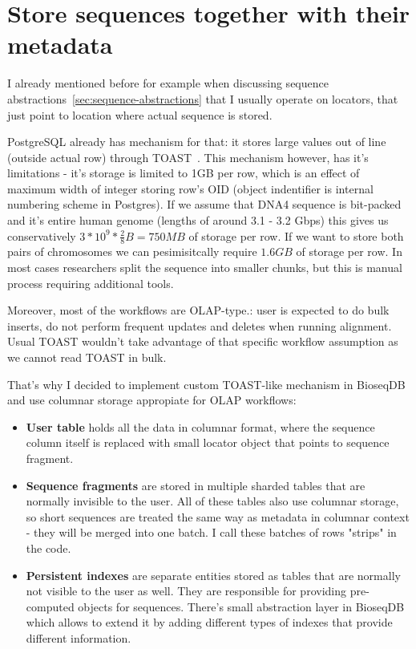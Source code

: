 
\section{Store sequences together with their metadata}
\label{sec:pg-storage-role}

I already mentioned before for example when discussing sequence abstractions~\ref{sec:sequence-abstractions} that I usually operate on locators, that just point to location where actual sequence is stored.

PostgreSQL already has mechanism for that: it stores large values out of line (outside actual row) through TOAST~\autocite{postgresql17_toast}. 
This mechanism however, has it's limitations - it's storage is limited to 1GB per row, which is an effect of maximum width of integer storing row's OID (object indentifier is internal numbering scheme in Postgres).
If we assume that DNA4 sequence is bit-packed and it's entire human genome (lengths of around 3.1 - 3.2 Gbps) this gives us conservatively $3 * 10^{9} * \frac{2}{8}B = 750MB$ of storage per row.
If we want to store both pairs of chromosomes we can pesimisitcally require $1.6GB$ of storage per row. 
In most cases researchers split the sequence into smaller chunks, but this is manual process requiring additional tools.

Moreover, most of the workflows are OLAP-type.: user is expected to do bulk inserts, do not perform frequent updates and deletes when running alignment.
Usual TOAST wouldn't take advantage of that specific workflow assumption as we cannot read TOAST in bulk.

That's why I decided to implement custom TOAST-like mechanism in BioseqDB and use columnar storage appropiate for OLAP workflows:
\begin{itemize}
  \item \textbf{User table} holds all the data in columnar format, where the sequence column itself is replaced with small locator object that points to sequence fragment.
  \item \textbf{Sequence fragments} are stored in multiple sharded tables that are normally invisible to the user. All of these tables also use columnar storage, so short sequences are treated the same way as metadata in columnar context - they will be merged into one batch. I call these batches of rows "strips" in the code.
  \item \textbf{Persistent indexes} are separate entities stored as tables that are normally not visible to the user as well. They are responsible for providing pre-computed objects for sequences. There's small abstraction layer in BioseqDB which allows to extend it by adding different types of indexes that provide different information.
\label{lst:types-of-storage-entities-in-bioseqdb}
\end{itemize}

